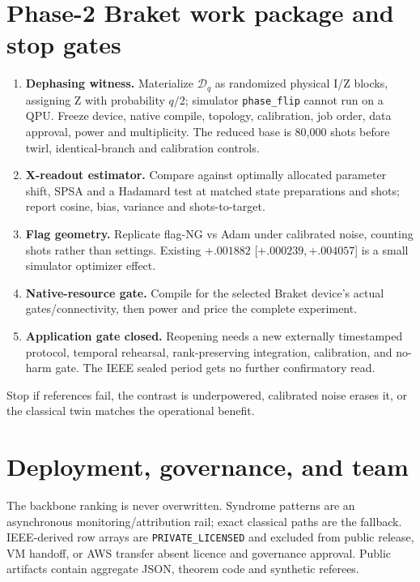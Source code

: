 \documentclass[10pt,a4paper]{article}
\begin{document}
\section{Phase-2 Braket work package and stop gates}
\begin{enumerate}
\item \textbf{Dephasing witness.} Materialize $\mathcal D_q$ as randomized
physical I/Z blocks, assigning Z with probability $q/2$; simulator
\texttt{phase\_flip} cannot run on a QPU. Freeze device, native compile,
topology, calibration, job order, data approval, power and multiplicity. The
reduced base is 80,000 shots before twirl, identical-branch and calibration
controls.
\item \textbf{X-readout estimator.} Compare against optimally allocated
parameter shift, SPSA and a Hadamard test at matched state preparations and
shots; report cosine, bias, variance and shots-to-target.
\item \textbf{Flag geometry.} Replicate flag-NG vs Adam under calibrated noise,
counting shots rather than settings. Existing $+.001882$
[$+.000239,+.004057$] is a small simulator optimizer effect.
\item \textbf{Native-resource gate.} Compile for the selected Braket device's
actual gates/connectivity, then power and price the complete experiment.
\item \textbf{Application gate closed.} Reopening needs a new externally
timestamped protocol, temporal rehearsal, rank-preserving integration,
calibration, and no-harm gate. The IEEE sealed period gets no further
confirmatory read.
\end{enumerate}
Stop if references fail, the contrast is underpowered, calibrated noise erases
it, or the classical twin matches the operational benefit.

\section{Deployment, governance, and team}

The backbone ranking is never overwritten. Syndrome patterns are an
asynchronous monitoring/attribution rail; exact classical paths are the
fallback. IEEE-derived row arrays are \texttt{PRIVATE\_LICENSED} and excluded
from public release, VM handoff, or AWS transfer absent licence and governance
approval. Public artifacts contain aggregate JSON, theorem code and synthetic
referees.
\end{document}

